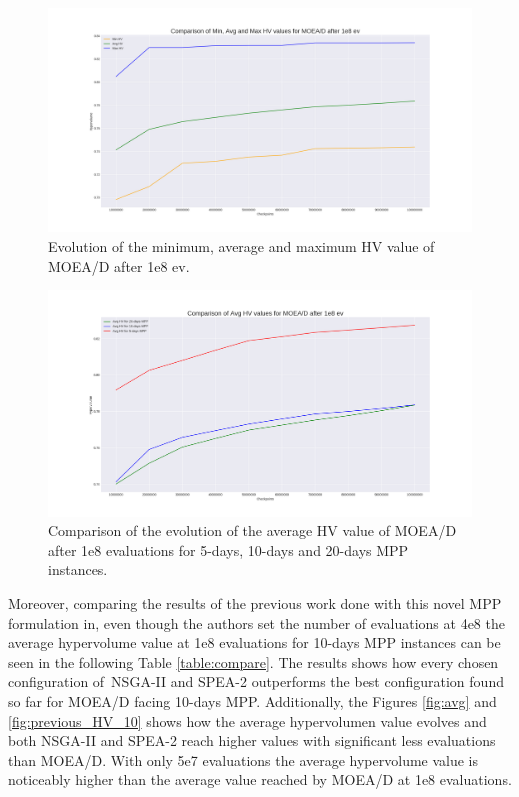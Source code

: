 \begin{figure}[H]
\centering
\includegraphics[scale=0.35]{../experiments/plots/minHV_avgHV_maxHV_evolution_10_days.png}
\caption{Evolution of the minimum, average and maximum HV value of MOEA/D after 1e8 ev.}
\label{fig:average}
\end{figure}

\begin{figure}[H]
\centering
\includegraphics[scale=0.35]{../experiments/plots/avgHV_evolution_5_vs_10_vs_20_days.png}
\caption{Comparison of the evolution of the average HV value of MOEA/D after 1e8 evaluations for 5-days, 10-days and 20-days MPP instances.}
\label{fig:comare}
\end{figure}

\pagebreak

Moreover, comparing the results of the previous work done with this novel MPP formulation in\cite{Miranda2018}, even though the authors set the number of evaluations at 4e8 the average hypervolume value at 1e8 evaluations for 10-days MPP instances can be seen in the following Table \ref{table:compare}. The results shows how every chosen configuration of~NSGA-II and SPEA-2 outperforms the best configuration found so far for MOEA/D facing 10-days MPP. Additionally, the Figures \ref{fig:avg} and \ref{fig:previous_HV_10} shows how the average hypervolumen value evolves and both NSGA-II and SPEA-2 reach higher values with significant less evaluations than MOEA/D. With only 5e7 evaluations the average hypervolume value is noticeably higher than the average value reached by MOEA/D at 1e8 evaluations.


